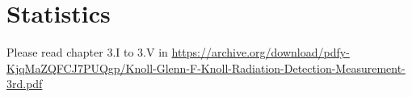 
\section{Statistics}

Please read chapter 3.I to 3.V in
\url{https://archive.org/download/pdfy-KjqMaZQFCJ7PUQgp/Knoll-Glenn-F-Knoll-Radiation-Detection-Measurement-3rd.pdf}






